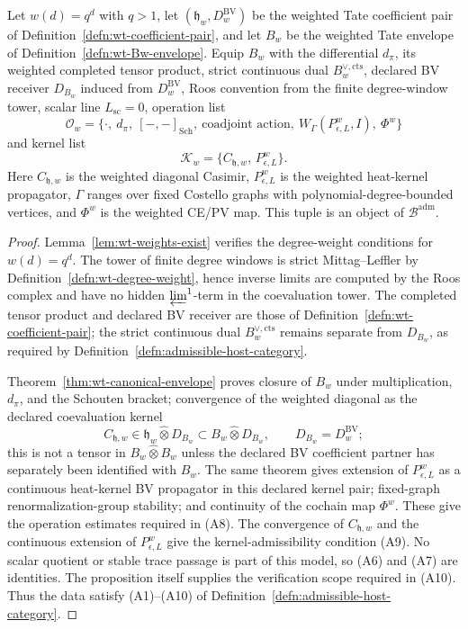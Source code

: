 \begin{prop}
\label{prop:verified-badm-weighted-model}
  Let \(w(d)=q^d\) with \(q>1\), let
  \((\mathfrak h_w,D^{\mathrm{BV}}_w)\) be the
  weighted Tate coefficient pair of
  Definition~\ref{defn:wt-coefficient-pair}, and let \(B_w\) be the
  weighted Tate envelope of Definition~\ref{defn:wt-Bw-envelope}.  Equip
  \(B_w\) with the differential \(d_\pi\), its weighted completed tensor
  product, strict continuous dual \(B_w^{\vee,\mathrm{cts}}\), declared
  BV receiver \(D_{B_w}\) induced from
  \(D^{\mathrm{BV}}_w\), Roos convention from the
  finite degree-window tower, scalar line \(L_{\mathrm{sc}}=0\),
  operation list
  \[
    \mathcal O_w=
    \{\cdot,\ d_\pi,\ [-,-]_{\mathrm{Sch}},\
      \text{coadjoint action},\
      W_\Gamma(P^w_{\epsilon,L},I),\
      \Phi^w\}
  \]
  and kernel list
  \[
    \mathcal K_w=\{C_{\mathfrak h,w},\,P^w_{\epsilon,L}\}.
  \]
  Here \(C_{\mathfrak h,w}\) is the weighted diagonal Casimir,
  \(P^w_{\epsilon,L}\) is the weighted heat-kernel propagator, \(\Gamma\)
  ranges over fixed Costello graphs with polynomial-degree-bounded
  vertices, and \(\Phi^w\) is the weighted CE/PV map.  This tuple is an
  object of \(\mathcal B^{\mathrm{adm}}\).
\end{prop}

\begin{proof}
  Lemma~\ref{lem:wt-weights-exist} verifies the degree-weight
  conditions for \(w(d)=q^d\).  The tower of finite degree windows is
  strict Mittag--Leffler by Definition~\ref{defn:wt-degree-weight},
  hence inverse limits are computed by the Roos complex and have no
  hidden \(\varprojlim^1\)-term in the coevaluation tower.  The completed
  tensor product and declared BV receiver are those of
  Definition~\ref{defn:wt-coefficient-pair}; the strict continuous dual
  \(B_w^{\vee,\mathrm{cts}}\) remains separate from \(D_{B_w}\), as
  required by Definition~\ref{defn:admissible-host-category}.

  Theorem~\ref{thm:wt-canonical-envelope} proves closure of \(B_w\)
  under multiplication, \(d_\pi\), and the Schouten bracket; convergence
  of the weighted diagonal as the declared coevaluation kernel
  \[
    C_{\mathfrak h,w}\in
    \mathfrak h_w\widehat\otimes D_{B_w}
    \subset B_w\widehat\otimes D_{B_w},
    \qquad D_{B_w}=D^{\mathrm{BV}}_w;
  \]
  this is not a tensor in \(B_w\widehat\otimes B_w\) unless the declared
  BV coefficient partner has separately been identified with \(B_w\).
  The same theorem gives extension of
  \(P^w_{\epsilon,L}\) as a continuous heat-kernel BV propagator in this
  declared kernel pair;
  fixed-graph renormalization-group stability; and continuity of the
  cochain map \(\Phi^w\).  These give the operation estimates required
  in (A8).  The convergence of \(C_{\mathfrak h,w}\) and the continuous
  extension of \(P^w_{\epsilon,L}\) give the kernel-admissibility
  condition (A9).  No scalar quotient or stable trace passage is part of
  this model, so (A6) and (A7) are identities.  The proposition itself
  supplies the verification scope required in (A10).  Thus the data
  satisfy (A1)--(A10) of
  Definition~\ref{defn:admissible-host-category}.
\end{proof}

